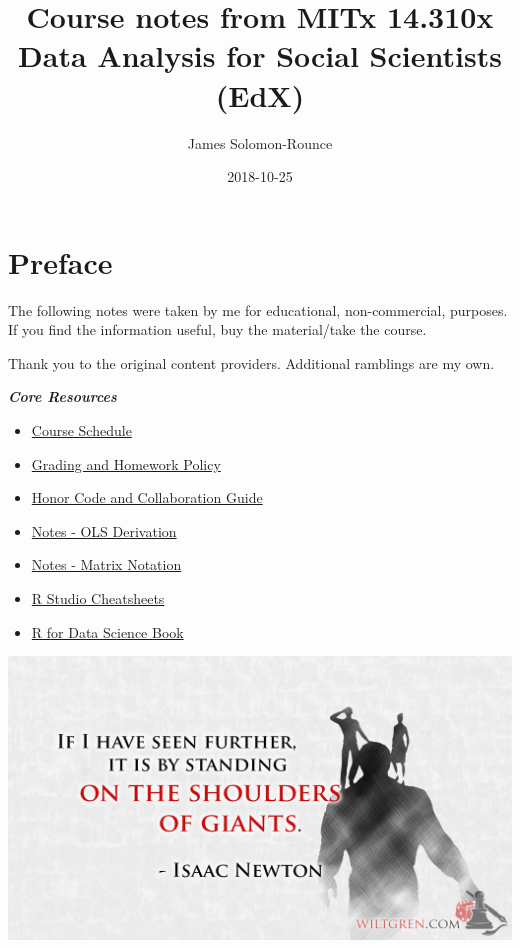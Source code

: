 \documentclass[]{book}
\title{Course notes from MITx 14.310x Data Analysis for Social Scientists (EdX)}
\author{James Solomon-Rounce}
\date{2018-10-25}
\providecommand{\tightlist}{%
  \setlength{\itemsep}{0pt}\setlength{\parskip}{0pt}}
\theoremstyle{definition}
\theoremstyle{definition}
\theoremstyle{definition}
\theoremstyle{remark}
\begin{document}
\maketitle

{
\setcounter{tocdepth}{1}
\tableofcontents
}
\chapter*{Preface}\label{preface}

The following notes were taken by me for educational, non-commercial,
purposes. If you find the information useful, buy the material/take the
course.

Thank you to the original content providers. Additional ramblings are my
own.

\textbf{\emph{Core Resources}}

\begin{itemize}
\tightlist
\item
  \href{./files/14.310x_3T2018_Schedule.pdf}{Course Schedule}
\item
  \href{./files/14.310x_Grading_and_Homework_Policy__3T2018.pdf}{Grading
  and Homework Policy}
\item
  \href{./files/14310x_Honor_Code_and_Collaboration_Guidelines.pdf}{Honor
  Code and Collaboration Guide}
\item
  \href{./files/Derivation_of_OLS_Estimators.pdf}{Notes - OLS
  Derivation}
\item
  \href{./files/Matrix_Notation_etc.pdf}{Notes - Matrix Notation}
\item
  \href{https://www.rstudio.com/resources/cheatsheets/}{R Studio
  Cheatsheets}
\item
  \href{http://r4ds.had.co.nz/index.html}{R for Data Science Book}
\end{itemize}

\includegraphics[width=1\linewidth]{images/standing}
\end{document}
